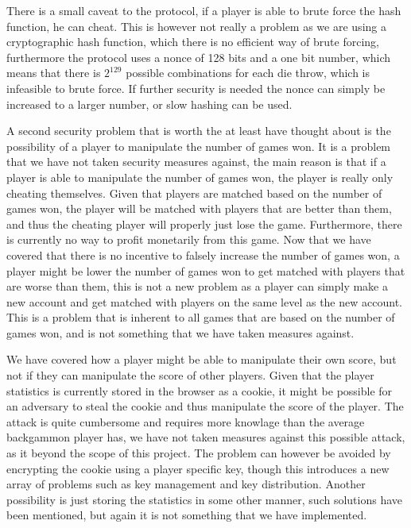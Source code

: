 \documentclass[ twoside,openright,titlepage,numbers=noenddot,headinclude,%
                footinclude=true,cleardoublepage=empty,abstractoff, %
                BCOR=5mm,paper=a4,fontsize=11pt,%
                ngerman,american,%
                ]{scrreprt}
\begin{document}
There is a small caveat to the protocol, if a player is able to brute force the hash function, he can cheat. This is however not really a problem as we are using a cryptographic hash function, which there is no efficient way of brute forcing, furthermore the protocol uses a nonce of 128 bits and a one bit number, which means that there is $2^{129}$ possible combinations for each die throw, which is infeasible to brute force. If further security is needed the nonce can simply be increased to a larger number, or slow hashing can be used.

A second security problem that is worth the at least have thought about is the possibility of a player to manipulate the number of games won. It is a problem that we have not taken security measures against, the main reason is that if a player is able to manipulate the number of games won, the player is really only cheating themselves. Given that players are matched based on the number of games won, the player will be matched with players that are better than them, and thus the cheating player will properly just lose the game. Furthermore, there is currently no way to profit monetarily from this game. Now that we have covered that there is no incentive to falsely increase the number of games won, a player might be lower the number of games won to get matched with players that are worse than them, this is not a new problem as a player can simply make a new account and get matched with players on the same level as the new account. This is a problem that is inherent to all games that are based on the number of games won, and is not something that we have taken measures against.

We have covered how a player might be able to manipulate their own score, but not if they can manipulate the score of other players. Given that the player statistics is currently stored in the browser as a cookie, it might be possible for an adversary to steal the cookie and thus manipulate the score of the player. The attack is quite cumbersome and requires more knowlage than the average backgammon player has, we have not taken measures against this possible attack, as it beyond the scope of this project. The problem can however be avoided by encrypting the cookie using a player specific key, though this introduces a new array of problems such as key management and key distribution. Another possibility is just storing the statistics in some other manner, such solutions have been mentioned, but again it is not something that we have implemented.
\end{document}
